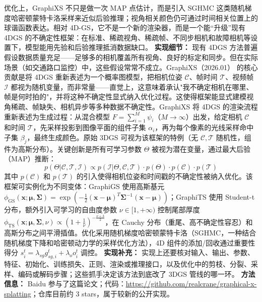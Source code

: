 优化上，GraphiXS 不只是做一次 MAP 点估计，而是引入 SGHMC 这类随机梯度哈密顿蒙特卡洛采样来近似后验推理；视角相关颜色仍可通过时间相关位置上的球谐函数表达。相对 4D-GS，它不是一个新的渲染器，而是一个能“升级”现有 4DGS 的不确定性框架：在标准、稀疏视角、稀疏帧、不同步相机和故障相机等设置下，模型能用先验和后验推理抵消数据缺口。
\textbf{实现细节：} 现有 4DGS 方法普遍假设数据质量充足——足够多的相机覆盖所有视角、良好的标定和同步。但在实际场景（如交通路口监控）中，这些假设常常不成立。GraphiXS（2026.01） 的核心贡献是将 4DGS 重新表述为一个概率图模型，把相机位姿 $\mathcal{C}$、帧时间 $\mathcal{T}$、视频帧 $\mathcal{I}$ 都视为随机变量，而非常量——直觉上，这意味着承认"我不确定相机在哪里、帧是何时拍的"，并将这种不确定性显式纳入优化过程。这使得框架能显式建模视角稀疏、帧缺失、相机异步等多种数据不确定性。GraphiXS 将 4DGS 的渲染流程重新表述为生成过程：从混合模型 $F = \sum_{i=1}^{M}\psi_i$（$M \to \infty$）出发，给定相机 $\mathcal{C}$ 和时间 $\mathcal{T}$，先采样投影到图像平面的组件子集 $\alpha_i$，再为每个像素的光线采样命中子集 $\beta_j$，最终生成颜色。原始 3DGS 可视为该框架的特例（无 $\mathcal{C}, \mathcal{T}$ 随机性，组件为高斯分布）。关键创新是所有可学习参数 $\Theta$ 被视为潜在变量，通过最大后验（MAP）推断： $$p(\Theta | \mathcal{C}, \mathcal{T}, \mathcal{I}) \propto p(\mathcal{I}|\Theta, \mathcal{C}, \mathcal{T}) \cdot p(\Theta) \cdot p(\mathcal{C}) \cdot p(\mathcal{T})$$ 其中 $p(\mathcal{C})$ 和 $p(\mathcal{T})$ 的引入使得相机位姿和时间戳的不确定性被纳入优化。该框架可实例化为不同变体：GraphiGS 使用高斯基元 $\phi_{\mathrm{GS}}(\mathbf{x}; \boldsymbol{\mu}, \boldsymbol{\Sigma}) = \exp(-\frac{1}{2}(\mathbf{x}-\boldsymbol{\mu})^T\boldsymbol{\Sigma}^{-1}(\mathbf{x}-\boldsymbol{\mu}))$；GraphiTS 使用 Student-t 分布，额外引入可学习的自由度参数 $\nu \in [1, +\infty)$ 控制尾部厚度 $\phi_{\mathrm{TS}}(\mathbf{x}; \boldsymbol{\mu}, \boldsymbol{\Sigma}, \nu) \propto (1+\frac{1}{\nu})^{-\frac{\nu+3}{2}}$，在 Cauchy 分布（重尾、高不确定性容忍）和高斯分布之间平滑插值。优化采用随机梯度哈密顿蒙特卡洛（SGHMC，一种结合随机梯度下降和哈密顿动力学的采样优化方法），4D 组件的添加/回收通过重要性得分 $s_i^t = \lambda_{sg} g_{sg,i}^t + \lambda_o o_i^t$ 调控。
\textbf{实现补充：} 实现上还要核对输入、输出、参数、特征、初始化、训练损失、正则、渲染或推理接口，以及优化中的剪枝、分裂、采样、编码或解码步骤；这些抓手决定该方法到底改了 3DGS 管线的哪一环。
\textbf{方法信息：} Baidu 参与了这篇论文；代码：\url{https://github.com/realcrane/graphical-x-splatting}；仓库目前约 3 stars，属于较新的公开实现。



